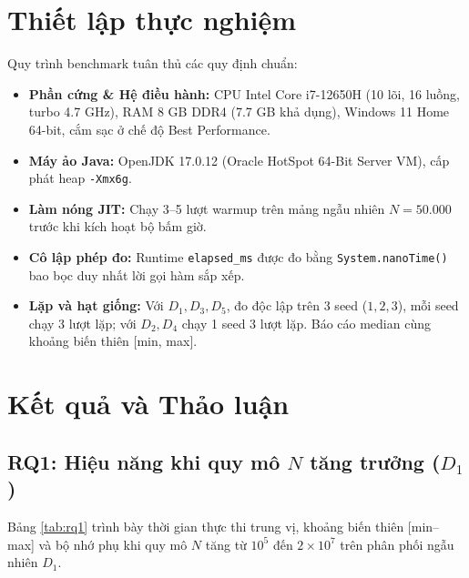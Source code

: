 \documentclass[conference]{IEEEtran}
\begin{document}
\section{Thiết lập thực nghiệm}

Quy trình benchmark tuân thủ các quy định chuẩn:
\begin{itemize}
    \item \textbf{Phần cứng & Hệ điều hành:} CPU Intel Core i7-12650H (10 lõi, 16 luồng, turbo 4.7 GHz), RAM 8 GB DDR4 (7.7 GB khả dụng), Windows 11 Home 64-bit, cắm sạc ở chế độ Best Performance.
    \item \textbf{Máy ảo Java:} OpenJDK 17.0.12 (Oracle HotSpot 64-Bit Server VM), cấp phát heap \texttt{-Xmx6g}.
    \item \textbf{Làm nóng JIT:} Chạy 3--5 lượt warmup trên mảng ngẫu nhiên $N = 50.000$ trước khi kích hoạt bộ bấm giờ.
    \item \textbf{Cô lập phép đo:} Runtime \texttt{elapsed\_ms} được đo bằng \texttt{System.nanoTime()} bao bọc duy nhất lời gọi hàm sắp xếp.
    \item \textbf{Lặp và hạt giống:} Với $D_1, D_3, D_5$, đo độc lập trên 3 seed ($1, 2, 3$), mỗi seed chạy 3 lượt lặp; với $D_2, D_4$ chạy 1 seed 3 lượt lặp. Báo cáo median cùng khoảng biến thiên [min, max].
\end{itemize}

\section{Kết quả và Thảo luận}

\subsection{RQ1: Hiệu năng khi quy mô $N$ tăng trưởng ($D_1$)}
Bảng \ref{tab:rq1} trình bày thời gian thực thi trung vị, khoảng biến thiên [min--max] và bộ nhớ phụ khi quy mô $N$ tăng từ $10^5$ đến $2\times 10^7$ trên phân phối ngẫu nhiên $D_1$.
\end{document}
